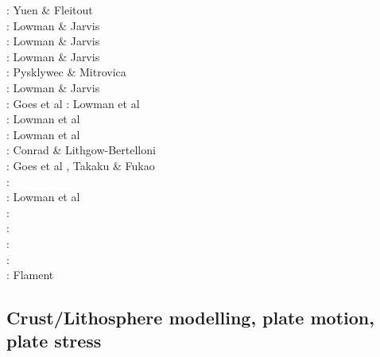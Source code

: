 \begin{scriptsize}
\nineteeneightyfive: Yuen \& Fleitout \cite{yufl85}\\
\nineteenninetythree: Lowman \& Jarvis \cite{loja93}\\
\nineteenninetyfive: Lowman \& Jarvis \cite{loja95}\\
\nineteenninetysix: Lowman \& Jarvis \cite{loja96}\\
\nineteenninetyeight: Pysklywec \& Mitrovica \cite{pymi98}\\
\nineteenninetynine: Lowman \& Jarvis \cite{loja99}\\
\twothousand: Goes et al \cite{golw00}
\twothousandone: Lowman et al \cite{lokg01} \\
\twothousandthree: Lowman et al \cite{lokg03} \\
\twothousandfour: Lowman et al \cite{lokg04} \\
\twothousandsix: Conrad \& Lithgow-Bertelloni \cite{coli06}\\
\twothousandeight: Goes et al \cite{gocm08}, Takaku \& Fukao \cite{tafu08}\\
\twothousandten: \cite{wamg10}\cite{stgb10}\cite{cobe10}\\
\twothousandeleven: Lowman et al \cite{lokt11}\\
\twothousandtwelve: \cite{algs12}\cite{roct12}\cite{crtm12}\\
\twothousandthirteen: \cite{ghbh13}\cite{yahb13}\\
\twothousandsixteen: \cite{macs16}\\
\twothousandeighteen: \cite{hulz18}\cite{osss18b}\\
\twothousandnineteen: Flament \cite{flam19}
\end{scriptsize}

\subsection{Crust/Lithosphere modelling, plate motion, plate stress}

